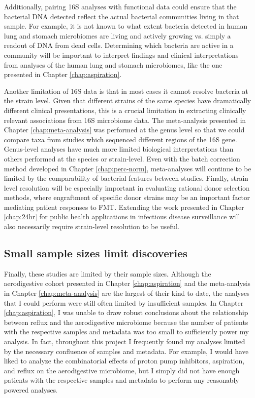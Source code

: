 Additionally, pairing 16S analyses with functional data could ensure that the bacterial DNA detected reflect the actual bacterial communities living in that sample.
For example, it is not known to what extent bacteria detected in human lung and stomach microbiomes are living and actively growing vs. simply a readout of DNA from dead cells.
Determining which bacteria are active in a community will be important to interpret findings and clinical interpretations from analyses of the human lung and stomach microbiomes, like the one presented in Chapter \ref{chap:aspiration}.

Another limitation of 16S data is that in most cases it cannot resolve bacteria at the strain level.
Given that different strains of the same species have dramatically different clinical presentations, this is a crucial limitation in extracting clinically relevant associations from 16S microbiome data.
The meta-analysis presented in Chapter \ref{chap:meta-analysis} was performed at the genus level so that we could compare taxa from studies which sequenced different regions of the 16S gene.
Genus-level analyses have much more limited biological interpretations than others performed at the species or strain-level.
Even with the batch correction method developed in Chapter \ref{chap:perc-norm}, meta-analyses will continue to be limited by the comparability of bacterial features between studies.
Finally, strain-level resolution will be especially important in evaluating rational donor selection methods, where engraftment of specific donor strains may be an important factor mediating patient responses to FMT.
Extending the work presented in Chapter \ref{chap:24hr} for public health applications in infectious disease surveillance will also necessarily require strain-level resolution to be useful.


\subsection{Small sample sizes limit discoveries}

Finally, these studies are limited by their sample sizes.
Although the aerodigestive cohort presented in Chapter \ref{chap:aspiration} and the meta-analysis in Chapter \ref{chap:meta-analysis} are the largest of their kind to date, the analyses that I could perform were still often limited by insufficient samples.
In Chapter \ref{chap:aspiration}, I was unable to draw robust conclusions about the relationship between reflux and the aerodigestive microbiome because the number of patients with the respective samples and metadata was too small to sufficiently power my analysis.
In fact, throughout this project I frequently found my analyses limited by the necessary confluence of samples and metadata.
For example, I would have liked to analyze the combinatorial effects of proton pump inhibitors, aspiration, and reflux on the aerodigestive microbiome, but I simply did not have enough patients with the respective samples and metadata to perform any reasonably powered analyses.

